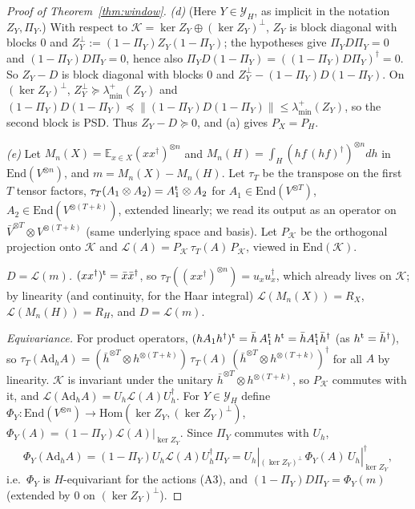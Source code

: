 \documentclass[11pt]{article}
\newcommand{\E}{\mathbb{E}}
\theoremstyle{definition}
\theoremstyle{remark}
\begin{document}
\begin{proof}[Proof of Theorem~\ref{thm:window}]
\emph{(d)} (Here $Y\in\mathcal Y_H$, as implicit in the notation $Z_Y,\Pi_Y$.) With respect to $\mathcal K=\ker Z_Y\oplus(\ker Z_Y)^\perp$, $Z_Y$ is block
diagonal with blocks $0$ and $Z_Y^\perp:=(1-\Pi_Y)Z_Y(1-\Pi_Y)$; the hypotheses give $\Pi_YD\Pi_Y=0$ and $(1-\Pi_Y)D\Pi_Y=0$, hence also
$\Pi_YD(1-\Pi_Y)=((1-\Pi_Y)D\Pi_Y)^\dagger=0$. So $Z_Y-D$ is block diagonal with blocks $0$ and $Z_Y^\perp-(1-\Pi_Y)D(1-\Pi_Y)$. On $(\ker Z_Y)^\perp$,
$Z_Y^\perp\succeq\lambda^+_{\min}(Z_Y)$ and $(1-\Pi_Y)D(1-\Pi_Y)\preceq\lVert(1-\Pi_Y)D(1-\Pi_Y)\rVert\le\lambda^+_{\min}(Z_Y)$, so the second block is PSD.
Thus $Z_Y-D\succeq0$, and (a) gives $P_X=P_H$.

\emph{(e)} Let $M_n(X)=\E_{x\in X}(xx^\dagger)^{\otimes n}$ and $M_n(H)=\int_H(hf\,(hf)^\dagger)^{\otimes n}dh$ in $\mathrm{End}(V^{\otimes n})$, and
$m=M_n(X)-M_n(H)$. Let $\tau_T$ be the transpose on the first $T$ tensor factors, $\tau_T(A_1\otimes A_2)=A_1^{\rm t}\otimes A_2$ for
$A_1\in\mathrm{End}(V^{\otimes T})$, $A_2\in\mathrm{End}(V^{\otimes(T+k)})$, extended linearly; we read its output as an operator on
$\bar V^{\otimes T}\otimes V^{\otimes(T+k)}$ (same underlying space and basis). Let $P_{\mathcal K}$ be the orthogonal projection onto $\mathcal K$ and
$\mathcal L(A)=P_{\mathcal K}\,\tau_T(A)\,P_{\mathcal K}$, viewed in $\mathrm{End}(\mathcal K)$.

\emph{$D=\mathcal L(m)$.} $(xx^\dagger)^{\rm t}=\bar x\bar x^\dagger$, so $\tau_T((xx^\dagger)^{\otimes n})=u_xu_x^\dagger$, which already lives on $\mathcal K$; by linearity
(and continuity, for the Haar integral) $\mathcal L(M_n(X))=R_X$, $\mathcal L(M_n(H))=R_H$, and $D=\mathcal L(m)$.

\emph{Equivariance.} For product operators, $(hA_1h^\dagger)^{\rm t}=\bar h\,A_1^{\rm t}\,h^{\rm t}=\bar hA_1^{\rm t}\bar h^\dagger$ (as $h^{\rm t}=\bar h^\dagger$), so
$\tau_T(\mathrm{Ad}_h A)=(\bar h^{\otimes T}\otimes h^{\otimes(T+k)})\,\tau_T(A)\,(\bar h^{\otimes T}\otimes h^{\otimes(T+k)})^\dagger$ for all $A$ by linearity. $\mathcal K$ is
invariant under the unitary $\bar h^{\otimes T}\otimes h^{\otimes(T+k)}$, so $P_{\mathcal K}$ commutes with it, and $\mathcal L(\mathrm{Ad}_hA)=U_h\mathcal L(A)U_h^\dagger$.
For $Y\in\mathcal Y_H$ define $\Phi_Y:\mathrm{End}(V^{\otimes n})\to\mathrm{Hom}(\ker Z_Y,(\ker Z_Y)^\perp)$, $\Phi_Y(A)=(1-\Pi_Y)\mathcal L(A)|_{\ker Z_Y}$. Since $\Pi_Y$
commutes with $U_h$,
\[
\Phi_Y(\mathrm{Ad}_hA)=(1-\Pi_Y)U_h\mathcal L(A)U_h^\dagger\Pi_Y=U_h|_{(\ker Z_Y)^\perp}\,\Phi_Y(A)\,U_h|_{\ker Z_Y}^\dagger ,
\]
i.e.\ $\Phi_Y$ is $H$-equivariant for the actions (A3), and $(1-\Pi_Y)D\Pi_Y=\Phi_Y(m)$ (extended by $0$ on $(\ker Z_Y)^\perp$).


\end{proof}
\end{document}
